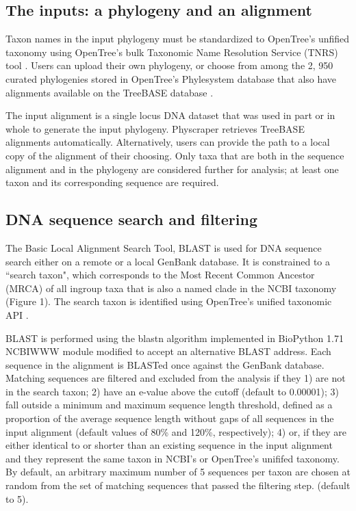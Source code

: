 \documentclass{bmcart}
\begin{document}
\subsection*{The inputs: a phylogeny and an alignment}

Taxon names in the input phylogeny must be standardized to OpenTree's unfified taxonomy
\cite{ott3.2} using OpenTree's bulk Taxonomic Name Resolution Service
(TNRS) tool \cite{TNRStool}. Users can upload their
own phylogeny, or choose from among the 2, 950 curated phylogenies stored in OpenTree's
Phylesystem database \cite{phylesystemGithub} that also have
alignments available on the TreeBASE database \cite{treebase_website, supertreebase}.

The input alignment is a single locus DNA dataset that was used in part or in
whole to generate the input phylogeny. Physcraper retrieves TreeBASE alignments
automatically. Alternatively, users can provide the path to a local copy of the
alignment of their choosing.
Only taxa that are both in the sequence alignment and in the phylogeny are considered
further for analysis; at least one taxon and its corresponding sequence are required.

\subsection*{DNA sequence search and filtering}

The Basic Local Alignment Search Tool, BLAST \cite{altschul1990basic} is used for DNA
sequence search either on a remote or a local GenBank database. It is constrained to a
 ``search taxon", which corresponds to the Most Recent Common Ancestor (MRCA) of
all ingroup taxa that is also a named clade in the NCBI taxonomy (Figure 1). The
search taxon is identified using OpenTree's unified taxonomic API \cite{mrcaAPI}.

BLAST is performed using the blastn algorithm \cite{camacho2009blast}
implemented in BioPython 1.71 \cite{cock2009biopython} NCBIWWW module \cite{ncbiwww}
modified to accept an alternative BLAST address.
Each sequence in the alignment is BLASTed once against the GenBank database.
Matching sequences are filtered and excluded from the analysis if they 1) are not in the search taxon;
2) have an e-value above the cutoff (default to 0.00001); 3) fall outside a minimum
and maximum sequence length threshold, defined as a proportion of the average sequence length without
gaps of all sequences in the input alignment (default values of 80\% and 120\%,
respectively); 4) or, if they are either identical to or shorter than an existing
sequence in the input alignment and they represent the same taxon in NCBI's or
OpenTree's unififed taxonomy.
By default, an arbitrary maximum number of 5 sequences per taxon are chosen at random
from the set of matching sequences that passed the filtering step.
(default to 5).
\end{document}
